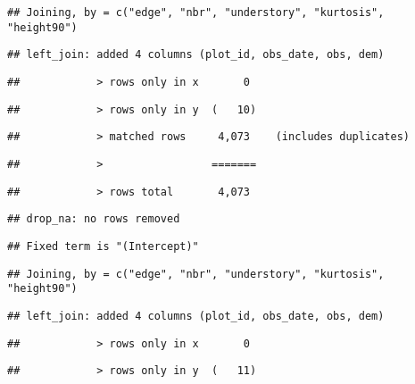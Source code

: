 \documentclass[
]{article}
\begin{document}
\begin{verbatim}
## Joining, by = c("edge", "nbr", "understory", "kurtosis", "height90")
\end{verbatim}

\begin{verbatim}
## left_join: added 4 columns (plot_id, obs_date, obs, dem)
\end{verbatim}

\begin{verbatim}
##            > rows only in x       0
\end{verbatim}

\begin{verbatim}
##            > rows only in y  (   10)
\end{verbatim}

\begin{verbatim}
##            > matched rows     4,073    (includes duplicates)
\end{verbatim}

\begin{verbatim}
##            >                 =======
\end{verbatim}

\begin{verbatim}
##            > rows total       4,073
\end{verbatim}

\begin{verbatim}
## drop_na: no rows removed
\end{verbatim}

\begin{verbatim}
## Fixed term is "(Intercept)"
\end{verbatim}

\begin{verbatim}
## Joining, by = c("edge", "nbr", "understory", "kurtosis", "height90")
\end{verbatim}

\begin{verbatim}
## left_join: added 4 columns (plot_id, obs_date, obs, dem)
\end{verbatim}

\begin{verbatim}
##            > rows only in x       0
\end{verbatim}

\begin{verbatim}
##            > rows only in y  (   11)
\end{verbatim}
\end{document}
